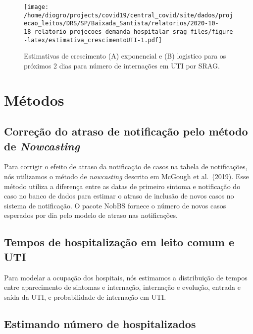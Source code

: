 \documentclass[
]{article}
\begin{document}
\begin{figure}
\centering
\texttt{[image: /home/diogro/projects/covid19/central\_covid/site/dados/projecao\_leitos/DRS/SP/Baixada\_Santista/relatorios/2020-10-18\_relatorio\_projecoes\_demanda\_hospitalar\_srag\_files/figure-latex/estimativa\_crescimentoUTI-1.pdf]}
\caption{Estimativas de crescimento (A) exponencial e (B) logistico para
os próximos 2 dias para número de internações em UTI por SRAG.}
\end{figure}

\hypertarget{muxe9todos}{%
\section{Métodos}\label{muxe9todos}}

\hypertarget{correuxe7uxe3o-do-atraso-de-notificauxe7uxe3o-pelo-muxe9todo-de-nowcasting}{%
\subsection{\texorpdfstring{Correção do atraso de notificação pelo
método de
\emph{Nowcasting}}{Correção do atraso de notificação pelo método de Nowcasting}}\label{correuxe7uxe3o-do-atraso-de-notificauxe7uxe3o-pelo-muxe9todo-de-nowcasting}}

Para corrigir o efeito de atraso da notificação de casos na tabela de
notificações, nós utilizamos o método de \emph{nowcasting} descrito em
McGough et al.~(2019). Esse método utiliza a diferença entre as datas de
primeiro sintoma e notificação do caso no banco de dados para estimar o
atraso de inclusão de novos casos no sistema de notificação. O pacote
NobBS fornece o número de novos casos esperados por dia pelo modelo de
atraso nas notificações.

\hypertarget{tempos-de-hospitalizauxe7uxe3o-em-leito-comum-e-uti}{%
\subsection{Tempos de hospitalização em leito comum e
UTI}\label{tempos-de-hospitalizauxe7uxe3o-em-leito-comum-e-uti}}

Para modelar a ocupação dos hospitais, nós estimamos a distribuição de
tempos entre aparecimento de sintomas e internação, internação e
evolução, entrada e saída da UTI, e probabilidade de internação em UTI.

\hypertarget{estimando-nuxfamero-de-hospitalizados}{%
\subsection{Estimando número de
hospitalizados}\label{estimando-nuxfamero-de-hospitalizados}}
\end{document}
